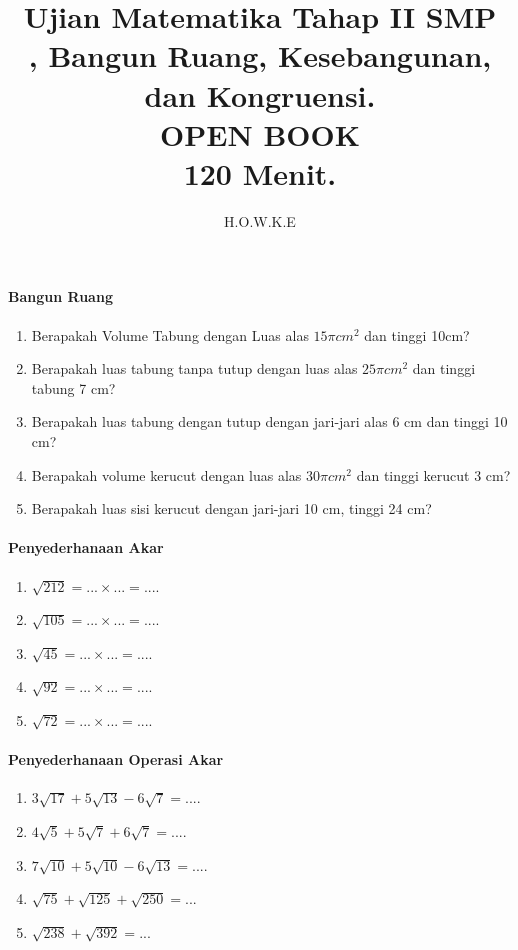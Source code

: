 \documentclass[12pt,a4paper]{exam}
\author{H.O.W.K.E}
\title{Ujian Matematika Tahap II SMP\\, Bangun Ruang, Kesebangunan, dan Kongruensi.\\ OPEN BOOK \\ 120 Menit.}
\begin{document}
	\maketitle
	\paragraph{Bangun Ruang}
	\begin{enumerate}
		\item Berapakah Volume Tabung dengan Luas alas $15\pi cm^2$ dan tinggi 10cm?
		\item Berapakah luas tabung tanpa tutup dengan luas alas $25\pi cm^2$ dan tinggi tabung 7 cm?
		\item Berapakah luas tabung dengan tutup dengan jari-jari alas 6 cm dan tinggi 10 cm?
		\item Berapakah volume kerucut dengan luas alas $30\pi cm^2$ dan tinggi kerucut 3 cm?
		\item Berapakah luas sisi kerucut dengan jari-jari 10 cm, tinggi 24 cm?
		
	\end{enumerate}
	\paragraph{Penyederhanaan Akar}
	\begin{enumerate}
		\item $\sqrt{212}=...\times...=....$
		\item $\sqrt{105}=...\times...=....$
		\item $\sqrt{45}=...\times...=....$
		\item $\sqrt{92}=...\times...=....$ 
		\item 
		$\sqrt{72}=...\times...=....$ 
	\end{enumerate}
	\paragraph{Penyederhanaan Operasi Akar}
	\begin{enumerate}
		\item
		$3\sqrt{17}+5\sqrt{13}-6\sqrt{7}=....$
		\item $4\sqrt{5}+5\sqrt{7}+6\sqrt{7}=....$
		\item $7\sqrt{10}+5\sqrt{10}-6\sqrt{13}=....$ 
		\item $\sqrt{75}+\sqrt{125}+\sqrt{250}=...$
		\item 
		$\sqrt{238}+\sqrt{392}=...$ 
	\end{enumerate}
\end{document}
